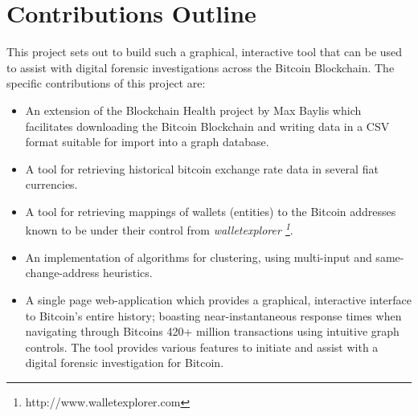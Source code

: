 \section{Contributions Outline}
This project sets out to build such a graphical, interactive tool that can be used to assist with digital forensic investigations across the Bitcoin Blockchain. The specific contributions of this project are:
\begin{itemize}
    \item An extension of the Blockchain Health project by Max Baylis which facilitates downloading the Bitcoin Blockchain and writing data in a CSV format suitable for import into a graph database.
    \item A tool for retrieving historical bitcoin exchange rate data in several fiat currencies.
    \item A tool for retrieving mappings of wallets (entities) to the Bitcoin addresses known to be under their control from \textit{walletexplorer \footnote{http://www.walletexplorer.com}}.
    \item An implementation of algorithms for clustering, using multi-input and same-change-address heuristics.
    \item A single page web-application which provides a graphical, interactive interface to Bitcoin's entire history; boasting near-instantaneous response times when navigating through Bitcoins 420+ million transactions \cite{RefWorks:doc:5cfba9cde4b0b8ab9a52e35c} using intuitive graph controls. The tool provides various features to initiate and assist with a digital forensic investigation for Bitcoin.
\end{itemize}





 